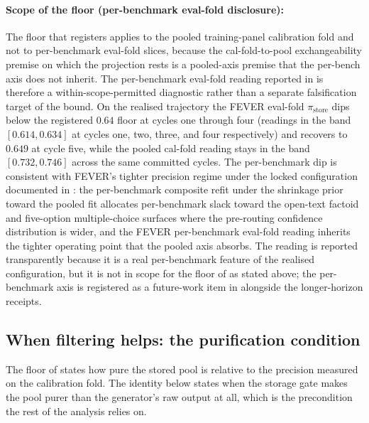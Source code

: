 \paragraph{Scope of the floor (per-benchmark eval-fold disclosure):} The floor that  registers applies to the pooled training-panel calibration fold and not to per-benchmark eval-fold slices, because the cal-fold-to-pool exchangeability premise on which the projection rests is a pooled-axis premise that the per-bench axis does not inherit. The per-benchmark eval-fold reading reported in  is therefore a within-scope-permitted diagnostic rather than a separate falsification target of the bound. On the realised trajectory the FEVER eval-fold $\pi_{\text{store}}$ dips below the registered $0.64$ floor at cycles one through four (readings in the band $[0.614, 0.634]$ at cycles one, two, three, and four respectively) and recovers to $0.649$ at cycle five, while the pooled cal-fold reading stays in the band $[0.732, 0.746]$ across the same committed cycles. The per-benchmark dip is consistent with FEVER's tighter precision regime under the locked configuration documented in : the per-benchmark composite refit under the shrinkage prior toward the pooled fit allocates per-benchmark slack toward the open-text factoid and five-option multiple-choice surfaces where the pre-routing confidence distribution is wider, and the FEVER per-benchmark eval-fold reading inherits the tighter operating point that the pooled axis absorbs. The reading is reported transparently because it is a real per-benchmark feature of the realised configuration, but it is not in scope for the floor of  as stated above; the per-benchmark axis is registered as a future-work item in  alongside the longer-horizon receipts.

\subsection{When filtering helps: the purification condition}
\label{sec:theorem-bayes}

The floor of  states how pure the stored pool is relative to the precision measured on the calibration fold. The identity below states when the storage gate makes the pool purer than the generator's raw output at all, which is the precondition the rest of the analysis relies on.

